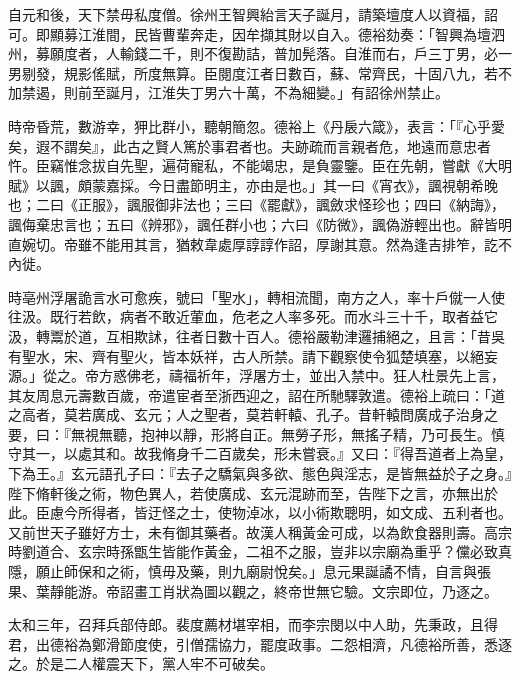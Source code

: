 \begin{pinyinscope}
 自元和後，天下禁毋私度僧。徐州王智興紿言天子誕月，請築壇度人以資福，詔可。即顯募江淮間，民皆曹輩奔走，因牟擷其財以自入。德裕劾奏：「智興為壇泗州，募願度者，人輸錢二千，則不復勘詰，普加髡落。自淮而右，戶三丁男，必一男剔發，規影傜賦，所度無算。臣閱度江者日數百，蘇、常齊民，十固八九，若不加禁遏，則前至誕月，江淮失丁男六十萬，不為細變。」有詔徐州禁止。



 時帝昏荒，數游幸，狎比群小，聽朝簡忽。德裕上《丹扆六箴》，表言：「『心乎愛矣，遐不謂矣』，此古之賢人篤於事君者也。夫跡疏而言親者危，地遠而意忠者忤。臣竊惟念拔自先聖，遍荷寵私，不能竭忠，是負靈鑒。臣在先朝，嘗獻《大明賦》以諷，頗蒙嘉採。今日盡節明主，亦由是也。」其一曰《宵衣》，諷視朝希晚也；二曰《正服》，諷服御非法也；三曰《罷獻》，諷斂求怪珍也；四曰《納誨》，諷侮棄忠言也；五曰《辨邪》，諷任群小也；六曰《防微》，諷偽游輕出也。辭皆明直婉切。帝雖不能用其言，猶敕韋處厚諄諄作詔，厚謝其意。然為逢吉排笮，訖不內徙。



 時亳州浮屠詭言水可愈疾，號曰「聖水」，轉相流聞，南方之人，率十戶僦一人使往汲。既行若飲，病者不敢近葷血，危老之人率多死。而水斗三十千，取者益它汲，轉鬻於道，互相欺訹，往者日數十百人。德裕嚴勒津邏捕絕之，且言：「昔吳有聖水，宋、齊有聖火，皆本妖祥，古人所禁。請下觀察使令狐楚填塞，以絕妄源。」從之。帝方惑佛老，禱福祈年，浮屠方士，並出入禁中。狂人杜景先上言，其友周息元壽數百歲，帝遣宦者至浙西迎之，詔在所馳驛敦遣。德裕上疏曰：「道之高者，莫若廣成、玄元；人之聖者，莫若軒轅、孔子。昔軒轅問廣成子治身之要，曰：『無視無聽，抱神以靜，形將自正。無勞子形，無搖子精，乃可長生。慎守其一，以處其和。故我脩身千二百歲矣，形未嘗衰。』又曰：『得吾道者上為皇，下為王。』玄元語孔子曰：『去子之驕氣與多欲、態色與淫志，是皆無益於子之身。』陛下脩軒後之術，物色異人，若使廣成、玄元混跡而至，告陛下之言，亦無出於此。臣慮今所得者，皆迂怪之士，使物淖冰，以小術欺聰明，如文成、五利者也。又前世天子雖好方士，未有御其藥者。故漢人稱黃金可成，以為飲食器則壽。高宗時劉道合、玄宗時孫甑生皆能作黃金，二祖不之服，豈非以宗廟為重乎？儻必致真隱，願止師保和之術，慎毋及藥，則九廟尉悅矣。」息元果誕譎不情，自言與張果、葉靜能游。帝詔畫工肖狀為圖以觀之，終帝世無它驗。文宗即位，乃逐之。



 太和三年，召拜兵部侍郎。裴度薦材堪宰相，而李宗閔以中人助，先秉政，且得君，出德裕為鄭滑節度使，引僧孺協力，罷度政事。二怨相濟，凡德裕所善，悉逐之。於是二人權震天下，黨人牢不可破矣。




\end{pinyinscope}
